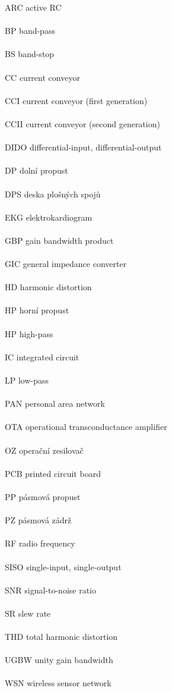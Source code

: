 ARC \hfill active RC \\ \\
BP \hfill band-pass \\ \\
BS \hfill band-stop \\ \\
CC \hfill current conveyor \\ \\
CCI \hfill current conveyor (first generation) \\ \\
CCII \hfill current conveyor (second generation) \\ \\
DIDO \hfill differential-input, differential-output \\ \\
DP \hfill dolní propust \\ \\
DPS \hfill deska plošných spojů \\ \\
EKG \hfill elektrokardiogram \\ \\
GBP \hfill gain bandwidth product \\ \\
GIC \hfill general impedance converter \\ \\
HD \hfill harmonic distortion \\ \\
HP \hfill horní propust \\ \\
HP \hfill high-pass \\ \\
IC \hfill integrated circuit \\ \\
LP \hfill low-pass \\ \\
PAN \hfill personal area network \\ \\
OTA \hfill operational transconductance amplifier \\ \\
OZ \hfill operační zesilovač \\ \\
PCB \hfill printed circuit board \\ \\
PP \hfill pásmová propust \\ \\
PZ \hfill pásmová zádrž \\ \\
RF \hfill radio frequency \\ \\
SISO \hfill single-input, single-output \\ \\
SNR \hfill signal-to-noise ratio \\ \\
SR \hfill slew rate \\ \\
THD \hfill total harmonic distortion \\ \\
UGBW \hfill unity gain bandwidth \\ \\
WSN \hfill wireless sensor network
